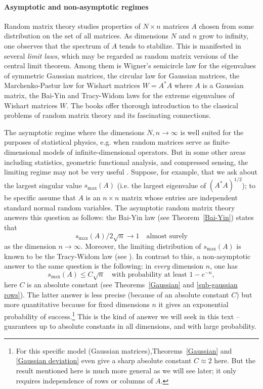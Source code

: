 \documentclass[10pt, openany]{book}
\theoremstyle{remark}
\def \smax {s_{\max}}
\begin{document}
\paragraph{Asymptotic and non-asymptotic regimes}
Random matrix theory studies properties of $N \times n$ matrices $A$ chosen from some distribution
on the set of all matrices. As dimensions $N$ and $n$ grow to infinity, one observes that the spectrum of $A$ tends to 
stabilize. This is manifested in several {\em limit laws}, which may be regarded as random matrix versions of the 
central limit theorem. Among them is Wigner's semicircle law for the eigenvalues of symmetric Gaussian
matrices, the circular law for Gaussian matrices, the Marchenko-Pastur law for Wishart matrices $W = A^*A$ where
$A$ is a Gaussian matrix, the Bai-Yin and Tracy-Widom laws for the extreme eigenvalues of Wishart matrices $W$.
The books \cite{Mehta, AGZ, Deift-Gioev, Bai-Silverstein} offer thorough introduction to the classical 
problems of random matrix theory and its fascinating connections.  

The asymptotic regime where the dimensions $N,n \to \infty$ is well suited for the purposes of 
statistical physics, e.g. when random matrices serve as finite-dimensional models of 
infinite-dimensional operators. But in some other areas including statistics,
geometric functional analysis, and compressed sensing, the limiting regime may not be very useful \cite{RV ICM}. 
Suppose, for example, that we ask about the largest singular value $\smax(A)$
(i.e. the largest eigenvalue of $(A^*A)^{1/2}$); to be specific assume that $A$ is an $n \times n$ matrix
whose entries are independent standard normal random variables. 
The asymptotic random matrix theory answers this question as follows: 
the Bai-Yin law (see Theorem~\ref{Bai-Yin}) states that
$$
\smax(A) / 2\sqrt{n} \to 1	\quad \text{almost surely}
$$ 
as the dimension $n \to \infty$.
Moreover, the limiting distribution of $\smax(A)$ is known to be the Tracy-Widom law
(see \cite{Soshnikov, FeSo}).
In contrast to this, a non-asymptotic answer to the same question is the following: 
in {\em every} dimension $n$, one has 
$$
\smax(A) \le C\sqrt{n} \quad \text{with probability at least } 1 - e^{-n},
$$
 here $C$
is an absolute constant (see Theorems~\ref{Gaussian} and \ref{sub-gaussian rows}). 
The latter answer is less precise (because of an absolute constant $C$) but more quantitative
because for fixed dimensions $n$ it gives an exponential probability of success.\footnote{For 
this specific model (Gaussian matrices),Theorems~\ref{Gaussian} and \ref{Gaussian deviation}
even give a sharp absolute constant $C\approx 2$ here. But the 
result mentioned here is much more general as we will see later; it only requires
independence of rows or columns of $A$.}
This is the kind of answer we will seek in this text --
guarantees up to absolute constants in all dimensions, and with large probability.
\end{document}
